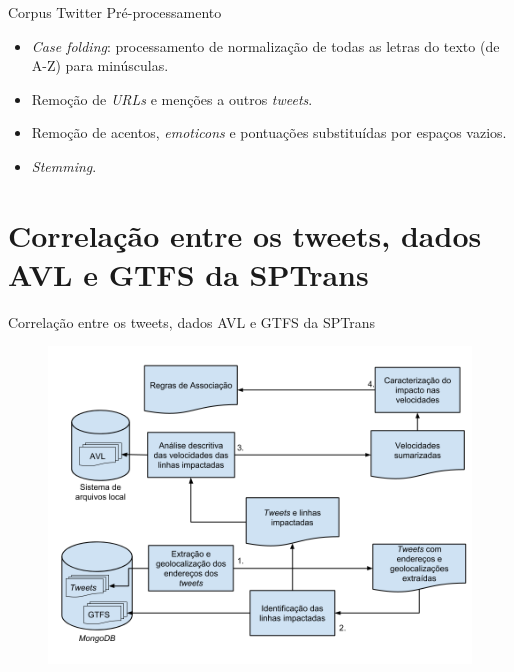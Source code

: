 \documentclass{beamer}
\begin{document}
\begin{frame}{Corpus Twitter}
Pré-processamento
\begin{itemize}
\item \textit{Case folding}: processamento de normalização de todas as letras do texto (de A-Z) para minúsculas.
\item Remoção de \textit{URLs} e menções a outros \textit{tweets}.
\item Remoção de acentos, \textit{emoticons} e pontuações substituídas por espaços vazios.
\item \textit{Stemming}. 
\end{itemize}

\end{frame}
\section{Correlação entre os tweets, dados AVL e GTFS da SPTrans}
\begin{frame}{Correlação entre os tweets, dados AVL e GTFS da SPTrans}
\begin{figure}
\includegraphics[width=0.9\linewidth]{caracterization_flow.png}
\end{figure}
\end{frame}
\end{document}
